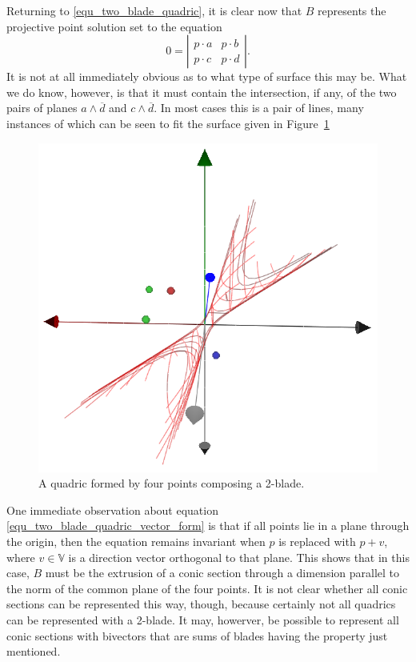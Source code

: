 \documentclass[12pt]{article}
\newcommand{\V}{\mathbb{V}}
\numberwithin{equation}{section}
\begin{document}
Returning to \eqref{equ_two_blade_quadric}, it is clear now that $B$ represents
the projective point solution set to the equation
\begin{equation}\label{equ_two_blade_quadric_vector_form}
0 = \left|\begin{array}{cc} p\cdot a & p\cdot b \\ p\cdot c & p\cdot d \end{array}\right|.
\end{equation}
It is not at all immediately obvious as to what type of surface this may be.  What we do know, however, is that it must
contain the intersection, if any, of the two pairs of planes $a\wedge\overline{d}$ and $c\wedge\overline{d}$.
In most cases this is a pair of lines, many instances of which can be seen to fit the surface
given in Figure~\ref{fig_quadric_blade}
\begin{figure}
\includegraphics[scale=0.7]{QuadricBlade}
\caption{A quadric formed by four points composing a 2-blade.}
\label{fig_quadric_blade}
\end{figure}

One immediate observation about equation \eqref{equ_two_blade_quadric_vector_form}
is that if all points lie in a plane through the origin, then the equation remains
invariant when $p$ is replaced with $p+v$, where $v\in\V$ is a direction vector
orthogonal to that plane.  This shows that in this case, $B$ must be the
extrusion of a conic section through a dimension parallel to the norm of
the common plane of the four points.  It is not clear whether all conic
sections can be represented this way, though, because certainly not
all quadrics can be represented with a 2-blade.  It may, howerver,
be possible to represent all conic sections with bivectors that are sums
of blades having the property just mentioned.
\end{document}
